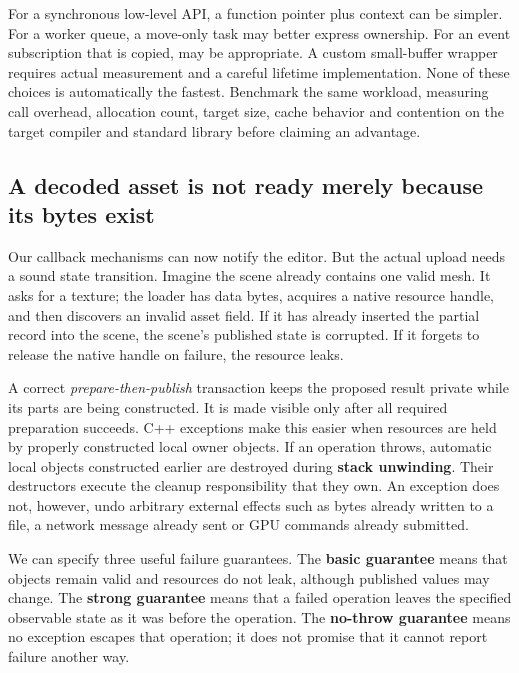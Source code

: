 For a synchronous low-level API, a function pointer plus context can be simpler. For a worker queue, a move-only task may better express ownership. For an event subscription that is copied,  may be appropriate. A custom small-buffer wrapper requires actual measurement and a careful lifetime implementation. None of these choices is automatically the fastest. Benchmark the same workload, measuring call overhead, allocation count, target size, cache behavior and contention on the target compiler and standard library before claiming an advantage.

\subsection{A decoded asset is not ready merely because its bytes exist}\label{01-foundations-i-ch004-a-decoded-asset-is-not-ready-merely-because-its-bytes-exist}

\hypertarget{01-foundations-i-ch004-a-decoded-asset-is-not-ready-merely-because-its-bytes-exist}{}

Our callback mechanisms can now notify the editor. But the actual upload needs a sound state transition. Imagine the scene already contains one valid mesh. It asks for a texture; the loader has data bytes, acquires a native resource handle, and then discovers an invalid asset field. If it has already inserted the partial record into the scene, the scene's published state is corrupted. If it forgets to release the native handle on failure, the resource leaks.

A correct \emph{prepare-then-publish} transaction keeps the proposed result private while its parts are being constructed. It is made visible only after all required preparation succeeds. C++ exceptions make this easier when resources are held by properly constructed local owner objects. If an operation throws, automatic local objects constructed earlier are destroyed during \textbf{stack unwinding}. Their destructors execute the cleanup responsibility that they own. An exception does not, however, undo arbitrary external effects such as bytes already written to a file, a network message already sent or GPU commands already submitted.

We can specify three useful failure guarantees. The \textbf{basic guarantee} means that objects remain valid and resources do not leak, although published values may change. The \textbf{strong guarantee} means that a failed operation leaves the specified observable state as it was before the operation. The \textbf{no-throw guarantee} means no exception escapes that operation; it does not promise that it cannot report failure another way.

